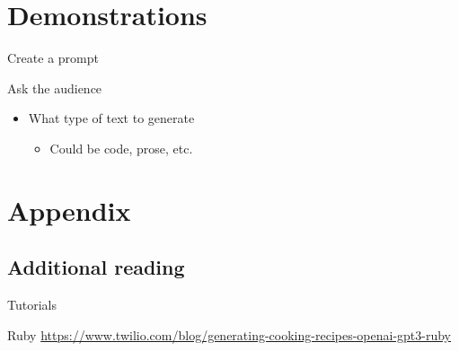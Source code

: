 \documentclass[presentation]{beamer}
\begin{document}
\section{Demonstrations}
\label{sec:org66ddcb8}
\begin{frame}[label={sec:org83d6286}]{Create a prompt}
\begin{block}{Ask the audience}
\begin{itemize}
\item What type of text to generate
\begin{itemize}
\item Could be code, prose, etc.
\end{itemize}
\end{itemize}
\end{block}
\end{frame}

\section{Appendix}
\label{sec:org634b99d}
\subsection{Additional reading}
\label{sec:orgdd78c80}
\begin{frame}[label={sec:org0231fb6}]{Tutorials}
\begin{block}{Ruby}
{\footnotesize
\url{https://www.twilio.com/blog/generating-cooking-recipes-openai-gpt3-ruby}
}
\end{block}
\end{frame}
\end{document}
